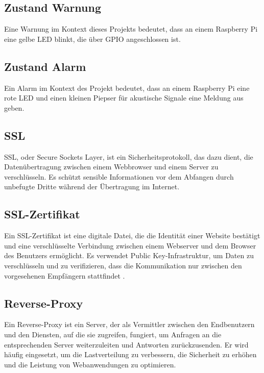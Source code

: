 \subsection{Zustand Warnung }
\label{subsec:warnung}
Eine Warnung im Kontext dieses Projekts bedeutet, dass an einem  Raspberry Pi  eine gelbe LED blinkt, die über GPIO angeschlossen ist. 

\subsection{Zustand Alarm}
\label{subsec:alarm}
Ein Alarm im Kontext des Projekt bedeutet, dass an einem Raspberry Pi eine rote LED und  einen kleinen Piepser für akustische Signale eine Meldung aus geben. 


\subsection{SSL}
\label{subsec:ssl}
SSL, oder Secure Sockets Layer, ist ein Sicherheitsprotokoll, das dazu dient, die Datenübertragung zwischen einem Webbrowser und einem Server zu verschlüsseln. Es schützt sensible Informationen vor dem Abfangen durch unbefugte Dritte während der Übertragung im Internet.

\subsection{SSL-Zertifikat}
\label{subsec:sslcertificate}
Ein SSL-Zertifikat ist eine digitale Datei, die die Identität einer Website bestätigt und eine verschlüsselte Verbindung zwischen einem Webserver und dem Browser des Benutzers ermöglicht. Es verwendet Public Key-Infrastruktur, um Daten zu verschlüsseln und zu verifizieren, dass die Kommunikation nur zwischen den vorgesehenen Empfängern stattfindet \cite {SSLcertificate}.

\subsection{Reverse-Proxy}
\label{subsec:reverseproxy}
Ein Reverse-Proxy ist ein Server, der als Vermittler zwischen den Endbenutzern und den Diensten, auf die sie zugreifen, fungiert, um Anfragen an die entsprechenden Server weiterzuleiten und Antworten zurückzusenden. Er wird häufig eingesetzt, um die Lastverteilung zu verbessern, die Sicherheit zu erhöhen und die Leistung von Webanwendungen zu optimieren\cite{Reverseproxy}.



